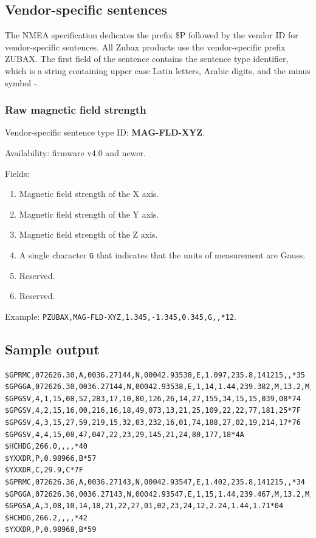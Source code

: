 \documentclass{zubaxdoc}
\begin{document}
\subsection{Vendor-specific sentences}

The NMEA specification dedicates the prefix {\$}P followed by the vendor ID for vendor-specific sentences. All Zubax products use the vendor-specific prefix ZUBAX. The first field of the sentence contains the sentence type identifier, which is a string containing upper case Latin letters, Arabic digits, and the minus symbol -.

\subsubsection{Raw magnetic field strength}

Vendor-specific sentence type ID: \textbf{MAG-FLD-XYZ}.

Availability: firmware v4.0 and newer.

Fields:

\begin{enumerate}
\item Magnetic field strength of the X axis.
\item Magnetic field strength of the Y axis.
\item Magnetic field strength of the Z axis.
\item A single character \texttt{G} that indicates that the units of measurement are Gauss.
\item Reserved.
\item Reserved.
\end{enumerate}

Example: \verb|PZUBAX,MAG-FLD-XYZ,1.345,-1.345,0.345,G,,*12|.

\subsection{Sample output}

\begin{verbatim}
$GPRMC,072626.30,A,0036.27144,N,00042.93538,E,1.097,235.8,141215,,*35
$GPGGA,072626.30,0036.27144,N,00042.93538,E,1,14,1.44,239.382,M,13.2,M,,*5E
$GPGSV,4,1,15,08,52,283,17,10,80,126,26,14,27,155,34,15,15,039,08*74
$GPGSV,4,2,15,16,00,216,16,18,49,073,13,21,25,109,22,22,77,181,25*7F
$GPGSV,4,3,15,27,59,219,15,32,03,232,16,01,74,188,27,02,19,214,17*76
$GPGSV,4,4,15,08,47,047,22,23,29,145,21,24,80,177,18*4A
$HCHDG,266.0,,,,*40
$YXXDR,P,0.98966,B*57
$YXXDR,C,29.9,C*7F
$GPRMC,072626.36,A,0036.27143,N,00042.93547,E,1.402,235.8,141215,,*34
$GPGGA,072626.36,0036.27143,N,00042.93547,E,1,15,1.44,239.467,M,13.2,M,,*5A
$GPGSA,A,3,08,10,14,18,21,22,27,01,02,23,24,12,2.24,1.44,1.71*04
$HCHDG,266.2,,,,*42
$YXXDR,P,0.98968,B*59
\end{verbatim}
\clearpage
\end{document}
